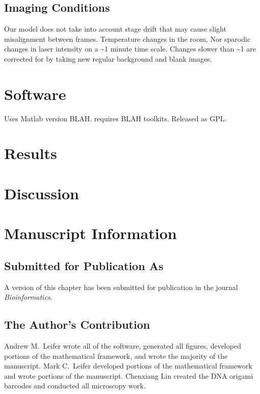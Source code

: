 \subsection{Imaging Conditions}
Our model does not take into account stage drift that may cause slight misalignment between frames. 
Temperature changes in the room, Nor sparodic changes in laser intensity on a \textasciitilde1 minute time scale. Changes slower than \textasciitilde1 are corrected for by taking new regular background and blank images.
 
\section{Software}
Uses Matlab version BLAH. requires BLAH toolkits. Released as GPL. 
\section{Results}

\section{Discussion}


\section{Manuscript Information}
\subsection{Submitted for Publication As}
A version of this chapter has been submitted for publication in the journal \textit{Bioinformatics}.

\subsection{The Author's Contribution}
Andrew M.~Leifer wrote all of the software, generated all figures, developed portions of the mathematical framework, and wrote the majority of the manuscript. Mark C.~Leifer developed portions of the mathematical framework and wrote portions of the manuscript. Chenxiang Lin created the DNA origami barcodes and conducted all microscopy work. 
 